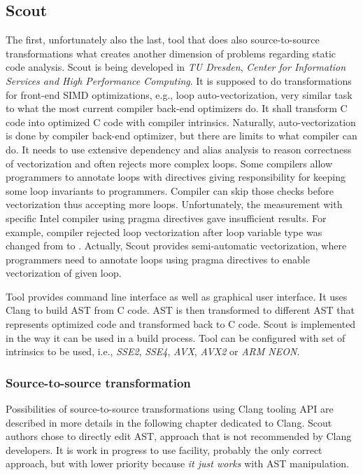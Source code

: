 \subsection{Scout}
\label{scout}
The first, unfortunately also the last, tool that does also source-to-source transformations what creates another dimension of problems regarding static code analysis. Scout is being developed in \emph{TU Dresden}, \emph{Center for Information Services and High Performance Computing}. It is supposed to do transformations for front-end SIMD optimizations, e.g., loop auto-vectorization, very similar task to what the most current compiler back-end optimizers do. It shall transform C code into optimized C code with compiler intrinsics. Naturally, auto-vectorization is done by compiler back-end optimizer, but there are limits to what compiler can do. It needs to use extensive dependency and alias analysis to reason correctness of vectorization and often rejects more complex loops. Some compilers allow programmers to annotate loops with  directives giving responsibility for keeping some loop invariants to programmers. Compiler can skip those checks before vectorization thus accepting more loops. Unfortunately, the measurement with specific Intel compiler using pragma directives gave insufficient results. For example, compiler rejected loop vectorization after loop variable type was changed from  to . Actually, Scout provides semi-automatic vectorization, where programmers need to annotate loops using pragma directives to enable vectorization of given loop. 

Tool provides command line interface as well as graphical user interface. It uses Clang to build AST from C code. AST is then transformed to different AST that represents optimized code and transformed back to C code. Scout is implemented in the way it can be used in a build process. Tool can be configured with set of intrinsics to be used, i.e., \emph{SSE2}, \emph{SSE4}, \emph{AVX}, \emph{AVX2} or \emph{ARM NEON}.

\subsubsection{Source-to-source transformation}
Possibilities of source-to-source transformations using Clang tooling API are described in more details in the following chapter dedicated to Clang. Scout authors chose to directly edit AST, approach that is not recommended by Clang developers. It is work in progress to use  facility, probably the only correct approach, but with lower priority because \textit{it just works} with AST manipulation.

